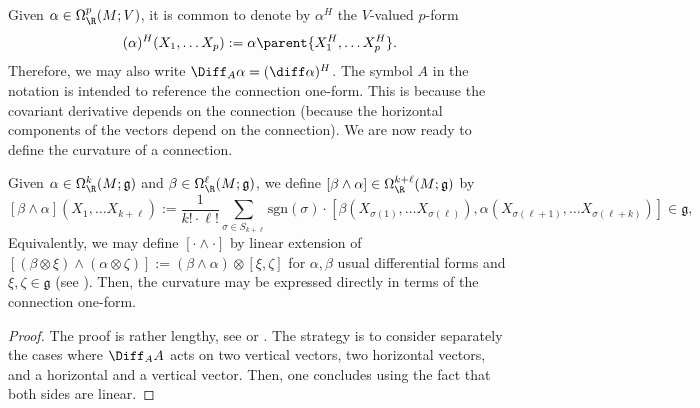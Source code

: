 Given \(\alpha \in \Omega^p_\R(M;V)\), it is common to denote by \(\alpha^H\) the \(V\)-valued \(p\)-form
\[
(\alpha)^H(X_1, \ldots X_p):=\alpha\parent{X_1^H, \ldots X_p^H}.
\]
Therefore, we may also write \(\Diff_A \alpha = (\diff \alpha)^H\). The symbol \(A\) in the notation is intended to reference the connection one-form. This is because the covariant derivative depends on the connection (because the horizontal components of the vectors depend on the connection). We are now ready to define the curvature of a connection.


Given \(\alpha \in \Omega^k_\R(M; \mathfrak{g})\) and \(\beta \in \Omega_\R^\ell(M;\mathfrak{g})\), we define \([\beta\wedge\alpha]\in \Omega^{k+\ell}_\R(M; \mathfrak{g})\) by
\begin{equation} \nonumber
    [\beta\wedge  \alpha](X_1, \ldots X_{k+\ell}):=\frac{1}{k! \cdot \ell !} \sum_{\sigma \in S_{k +\ell}} \mathrm{sgn}(\sigma)\cdot [\beta(X_{\sigma(1)}, \ldots X_{\sigma(\ell)}), \alpha(X_{\sigma(\ell+1)}, \ldots X_{\sigma(\ell+k)})] \in \mathfrak{g},
\end{equation}
Equivalently, we may define \([\cdot \wedge \cdot ]\) by linear extension of \([(\beta \otimes \xi) \wedge (\alpha \otimes \zeta)]:=(\beta \wedge \alpha)\otimes [\xi, \zeta]\) for \(\alpha, \beta\) usual differential forms and \(\xi, \zeta \in \mathfrak{g}\) (see \parencite[Sec. 5.2]{hamilton2018mathematical}). Then, the curvature may be expressed directly in terms of the connection one-form.
\begin{proof}
    The proof is rather lengthy, see \parencite[Th. 5.2]{kobayashi_vol1} or \parencite[Th. 11.2]{sontz2015principal}. The strategy is to consider separately the cases where \(\Diff_AA\) acts on two vertical vectors, two horizontal vectors, and a horizontal and a vertical vector. Then, one concludes using the fact that both sides are linear.
\end{proof}

